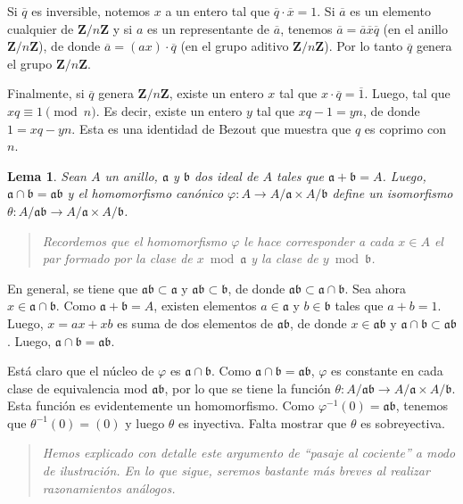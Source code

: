 \documentclass[bibtotoc,leqno,spanish]{amsbook}
\newcommand{\ZZ}{\mathbf{Z}}
\newcommand{\idl}[1]{\mathfrak{#1}}
\newcommand{\oline}[1]{\overline{#1}}
\renewcommand{\to}[1][]{\xrightarrow{#1}}
\numberwithin{equation}{section}
\newenvironment{comm}%
	{\begin{quotation}\itshape\Small}
	{\end{quotation}}
\theoremstyle{note}
\theoremstyle{note}
\newtheorem{lemma}{Lema}
\theoremstyle{rem}
\numberwithin{theorem}{section}
\numberwithin{proposition}{section}
\numberwithin{definition}{section}
\numberwithin{lemma}{section}
\numberwithin{corollary}{section}
\numberwithin{example}{section}
\numberwithin{footnote}{section}%
\begin{document}
Si $\oline q$ es inversible, notemos $x$ a un entero tal que $\oline q\cdot\oline x = 1$.
Si $\oline a$ es un elemento cualquier de $\ZZ/n\ZZ$ y si $a$ es un representante de $\oline a$,
tenemos $\oline a = \oline a\oline x\oline q$ (en el anillo $\ZZ/n\ZZ$), de donde
$\oline a = (ax)\cdot\oline q$ (en el grupo aditivo $\ZZ/n\ZZ$). Por lo tanto $\oline q$
genera el grupo $\ZZ/n\ZZ$.

Finalmente, si $\oline q$ genera $\ZZ/n\ZZ$, existe un entero
$x$ tal que $x\cdot\oline q = \oline 1$. Luego, tal que $xq\equiv 1\pmod n$. Es decir,
existe un entero $y$ tal que $xq-1=yn$, de donde $1 = xq-yn$. Esta es una identidad de Bezout
que muestra que $q$ es coprimo con $n$.

\begin{lemma}\label{lem1.3.1}
Sean $A$ un anillo, $\idl{a}$ y $\idl{b}$ dos ideal de $A$ tales que $\idl{a}+\idl{b}=A$.
Luego, $\idl{a}\cap\idl{b} = \idl{a}\idl{b}$ y el homomorfismo can\'onico
$\varphi:A\to A/\idl{a}\times A/\idl{b}$ define un isomorfismo $\theta:A/\idl{a}\idl{b}\to A/\idl{a}\times
A/\idl{b}$.
\end{lemma}

\begin{comm}
Recordemos que el homomorfismo $\varphi$ le hace corresponder a cada $x\in A$ el par formado
por la clase de $x\bmod\idl{a}$ y la clase de $y\bmod\idl{b}$.
\end{comm}

En general, se tiene que $\idl{a}\idl{b}\subset\idl{a}$ y $\idl{a}\idl{b}\subset\idl{b}$, de
donde $\idl{a}\idl{b}\subset\idl{a}\cap\idl{b}$. Sea ahora $x\in\idl{a}\cap\idl{b}$.
Como $\idl{a}+\idl{b}=A$, existen elementos $a\in\idl{a}$ y $b\in\idl{b}$ tales
que $a+b=1$. Luego, $x = ax+xb$ es suma de dos elementos de $\idl{a}\idl{b}$, de donde
$x\in\idl{a}\idl{b}$ y $\idl{a}\cap\idl{b}\subset\idl{a}\idl{b}$. Luego,
$\idl{a}\cap\idl{b} = \idl{a}\idl{b}$.

Est\'a claro que el n\'ucleo de $\varphi$ es $\idl{a}\cap\idl{b}$. Como $\idl{a}\cap\idl{b}
=\idl{a}\idl{b}$, $\varphi$ es constante en cada clase de equivalencia mod $\idl{a}\idl{b}$,
por lo que se tiene la funci\'on $\theta : A/\idl{a}\idl{b}\to A/\idl{a}\times A/\idl{b}$.
Esta funci\'on es evidentemente un homomorfismo. Como $\varphi^{-1}(0) = \idl{a}\idl{b}$,
tenemos que $\theta^{-1}(0) = (0)$ y luego $\theta$ es inyectiva. Falta mostrar que $\theta$
es sobreyectiva.

\begin{comm}
Hemos explicado con detalle este argumento de ``pasaje al cociente'' a modo de ilustraci\'on.
En lo que sigue, seremos bastante m\'as breves al realizar razonamientos an\'alogos.
\end{comm}
\end{document}
